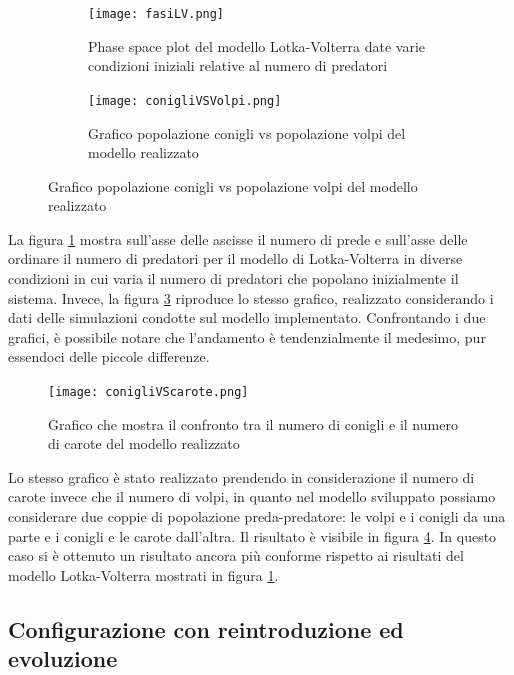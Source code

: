 \documentclass[11pt]{article}
\begin{document}
\begin{figure}[h!]
	\hspace{-5mm}
	\begin{subfigure}{.5\textwidth}
    \centering
     \texttt{[image: fasiLV.png]}
     \caption{Phase space plot del modello Lotka-Volterra date varie condizioni iniziali relative al numero di predatori}
     \label{fig:LVPhaseSpace}
	\end{subfigure}
	\begin{subfigure}{.5\textwidth}
		\hspace{10mm}
		\centering
     \texttt{[image: conigliVSVolpi.png]}
     \caption{Grafico popolazione conigli vs popolazione volpi del modello realizzato}
     \label{fig:conigliVolpi}
	\end{subfigure}
\end{figure}
\begin{figure}[h!]
     
\end{figure}


La figura \ref{fig:LVPhaseSpace} mostra sull'asse delle ascisse il numero di prede e sull'asse delle ordinare il numero di predatori per il modello di Lotka-Volterra in diverse condizioni in cui varia il numero di predatori che popolano inizialmente il sistema. Invece, la figura \ref{fig:conigliVolpi} riproduce lo stesso grafico, realizzato considerando i dati delle simulazioni condotte sul modello implementato. Confrontando i due grafici, è possibile notare che l'andamento è tendenzialmente il medesimo, pur essendoci delle piccole differenze. 


\begin{figure}[h!]
     \centering
     \texttt{[image: conigliVScarote.png]}
     \caption{Grafico che mostra il confronto tra il numero di conigli e il numero di carote del modello realizzato}
     \label{fig:conigliCarote}
\end{figure}

Lo stesso grafico è stato realizzato prendendo in considerazione il numero di carote invece che il numero di volpi, in quanto nel modello sviluppato possiamo considerare due coppie di popolazione preda-predatore: le volpi e i conigli da una parte e i conigli e le carote dall'altra.  Il risultato è visibile in figura \ref{fig:conigliCarote}. In questo caso si è ottenuto un risultato ancora più conforme rispetto ai risultati del modello Lotka-Volterra mostrati in figura \ref{fig:LVPhaseSpace}.




\subsection{Configurazione con reintroduzione ed evoluzione}
\end{document}
